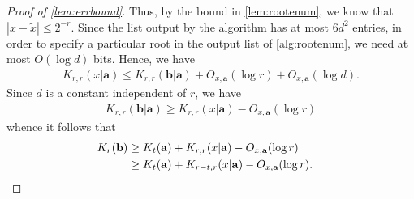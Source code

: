 \documentclass[a4paper,UKenglish,cleveref,autoref,thm-restate]{lipics-v2021}
\begin{document}
\begin{proof}[Proof of \cref{lem:errbound}]
	Thus, by the bound in \cref{lem:rootenum}, we know that
	$|x - \tilde{x}| \le 2^{-r}$. Since the list output by the algorithm
	has at most $6d^2$ entries, in order to specify a particular root in
	the output list of \cref{alg:rootenum}, we need at most $O(\log d)$
	bits. Hence, we have
	\begin{align*}
		K_{r,r}(x|\mathbf{a}) \le 
		K_{r,r}(\mathbf{b} | \mathbf{a}) + 
		O_{x,\mathbf{a}}(\log r) + 
		O_{x,\mathbf{a}}(\log d).
	\end{align*}
	Since $d$ is a constant independent of $r$, we have
	\begin{align}
		\label{ineq:errorbound_two}
		K_{r,r}(\mathbf{b}|\mathbf{a}) \ge K_{r,r}(x|\mathbf{a}) 
		- O_{x,\mathbf{a}}(\log r)
	\end{align}
	whence it follows that
	\begin{align*}
		K_r(\mathbf{b}) &\geq K_t(\mathbf{a}) + K_{r,r}(x|\mathbf{a}) -
		O_{x,\mathbf{a}}(\log r)\\
		&\geq K_t(\mathbf{a}) + K_{r-t,r}(x|\mathbf{a}) -
		O_{x,\mathbf{a}}(\log r).%
		\quad\qedhere
	\end{align*}
\end{proof}
\end{document}
